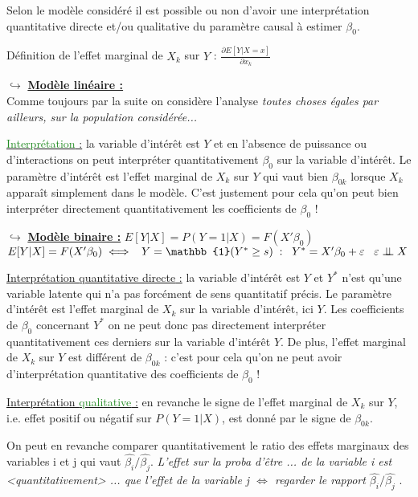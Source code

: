 Selon le modèle considéré il est possible ou non d'avoir une interprétation quantitative directe et/ou qualitative du paramètre causal à estimer $\beta_{0}$.\par
Définition de l'effet marginal de $X_{k}$ sur $Y$ : $\frac{\partial E[Y|X=x]}{\partial x_{k}}$
\bigbreak

\noindent $\hookrightarrow$ \underline{\textbf{Modèle linéaire :}}\\
Comme toujours par la suite on considère l'analyse \textit{toutes choses égales par ailleurs, sur la population considérée...}\par
\underline{\textcolor{ForestGreen}{Interprétation} :} la variable d'intérêt est $Y$ et en l'absence de puissance ou d'interactions on peut interpréter quantitativement $\beta_{0}$ sur la variable d'intérêt. Le paramètre d'intérêt est l'effet marginal de $X_{k}$ sur $Y$ qui vaut bien $\beta_{0k}$ lorsque $X_{k}$ apparaît simplement dans le modèle. C'est justement pour cela qu'on peut bien interpréter directement quantitativement les coefficients de $\beta_{0}$ !
\bigbreak

\noindent $\hookrightarrow$ \underline{\textbf{Modèle binaire :}} $E[Y|X]=P(Y=1|X)=F(X'\beta_{0})$ \\
$E[Y|X]=F(X'\beta_{0}) \; \Longleftrightarrow \; \; \; Y=\mathbb{1}(Y^{*} \geq s) \; : \; \; Y^{*}=X'\beta_{0} + \varepsilon \; \; \; \varepsilon \indep X $ \par
\underline{Interprétation \textcolor{BrickRed}{quantitative directe} :} la variable d'intérêt est $Y$ et $Y^{*}$ n'est qu'une variable latente qui n'a pas forcément de sens quantitatif précis. Le paramètre d'intérêt est l'effet marginal de $X_{k}$ sur la variable d'intérêt, ici $Y$. Les coefficients de $\beta_{0}$ concernant $Y^{*}$ on ne peut donc pas directement interpréter quantitativement ces derniers sur la variable d'intérêt $Y$. De plus, l'effet marginal de $X_{k}$ sur $Y$ est différent de $\beta_{0k}$ : c'est pour cela qu'on ne peut avoir d'interprétation quantitative des coefficients de $\beta_{0}$ ! \par
\underline{Interprétation \textcolor{ForestGreen}{qualitative} :} en revanche le signe de l'effet marginal de $X_{k}$ sur $Y$, i.e. effet positif ou négatif sur $P(Y=1|X)$, est donné par le signe de $\beta_{0k}$. \par
On peut en revanche comparer quantitativement le ratio des effets marginaux des variables i et j qui vaut $\widehat{\beta_{i}}/\widehat{\beta_{j}}$. \textit{L'effet sur la proba d'être ... de la variable i est <quantitativement> ... que l'effet de la variable j $\Longleftrightarrow$ regarder le rapport $\widehat{\beta_{i}}/\widehat{\beta_{j}}$ }.

